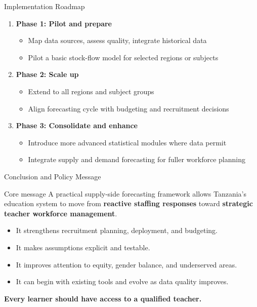 \documentclass[aspectratio=169,11pt]{beamer}
\newcommand{\highlight}[1]{\textcolor{DavidsonBlueDark}{\textbf{#1}}}
\newcommand{\gold}[1]{\textcolor{AccentGold}{\textbf{#1}}}
\begin{document}
\begin{frame}{Implementation Roadmap}
\begin{enumerate}
  \item \highlight{Phase 1: Pilot and prepare}
  \begin{itemize}
    \item Map data sources, assess quality, integrate historical data
    \item Pilot a basic stock-flow model for selected regions or subjects
  \end{itemize}
  \item \highlight{Phase 2: Scale up}
  \begin{itemize}
    \item Extend to all regions and subject groups
    \item Align forecasting cycle with budgeting and recruitment decisions
  \end{itemize}
  \item \highlight{Phase 3: Consolidate and enhance}
  \begin{itemize}
    \item Introduce more advanced statistical modules where data permit
    \item Integrate supply and demand forecasting for fuller workforce planning
  \end{itemize}
\end{enumerate}
\end{frame}

\begin{frame}{Conclusion and Policy Message}
\begin{block}{Core message}
\justifying
A practical supply-side forecasting framework allows Tanzania's education system to move from \highlight{reactive staffing responses} toward \highlight{strategic teacher workforce management}.
\end{block}
\vspace{0.15cm}
\begin{itemize}
  \item It strengthens recruitment planning, deployment, and budgeting.
  \item It makes assumptions explicit and testable.
  \item It improves attention to equity, gender balance, and underserved areas.
  \item It can begin with existing tools and evolve as data quality improves.
\end{itemize}
\vspace{0.2cm}
\centering
\Large\gold{Every learner should have access to a qualified teacher.}
\end{frame}
\end{document}
